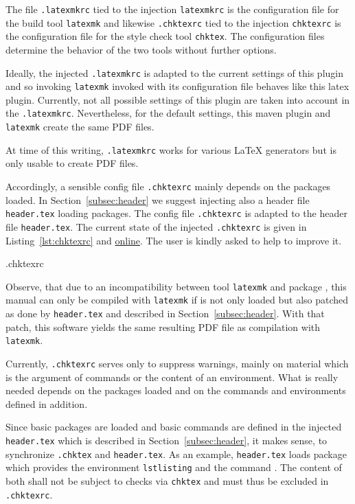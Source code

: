 The file \texttt{.latexmkrc} tied to the injection \texttt{latexmkrc} 
is the configuration file for the build tool \texttt{latexmk} 
and likewise \texttt{.chktexrc} tied to the injection \texttt{chktexrc} 
is the configuration file for the style check tool \texttt{chktex}. 
The configuration files determine the behavior of the two tools without further options. 

Ideally, the injected \texttt{.latexmkrc} is adapted to the current settings of this plugin 
and so invoking \texttt{latexmk} invoked with its configuration file 
behaves like this latex plugin. 
Currently, not all possible settings of this plugin 
are taken into account in the \texttt{.latexmkrc}. 
Nevertheless, for the default settings, 
this maven plugin and \texttt{latexmk} create the same PDF files. 

At time of this writing, \texttt{.latexmkrc} works for various \LaTeX{} generators 
but is only usable to create PDF files. 

Accordingly, a sensible config file \texttt{.chktexrc} mainly depends on the packages loaded. 
In Section~\ref{subsec:header} we suggest injecting also a header file \texttt{header.tex} 
loading packages. 
The config file \texttt{.chktexrc} is adapted to the header file \texttt{header.tex}. 
The current state of the injected \texttt{.chktexrc} is given in Listing~\ref{lst:chktexrc} 
and \href{\urlSite fromTex/.chktexrc}{online}. 
The user is kindly asked to help to improve it.

%
{.chktexrc}

Observe, that due to an incompatibility between tool \texttt{latexmk} and package , 
this manual can only be compiled with \texttt{latexmk} 
if  is not only loaded but also patched 
as done by \texttt{header.tex} and described in Section~\ref{subsec:header}. 
With that patch, this software yields the same resulting PDF file 
as compilation with \texttt{latexmk}. 

Currently, \texttt{.chktexrc} serves only to suppress warnings, 
mainly on material which is the argument of commands or the content of an environment. 
What is really needed depends on the packages loaded 
and on the commands and environments defined in addition. 

Since basic packages are loaded and basic commands are defined 
in the injected \texttt{header.tex} 
which is described in Section~\ref{subsec:header}, 
it makes sense, to synchronize \texttt{.chktex} and \texttt{header.tex}. 
As an example, \texttt{header.tex} loads package  
which provides the environment \texttt{lstlisting} and the command . 
The content of both shall not be subject to checks via \texttt{chktex} 
and must thus be excluded in \texttt{.chktexrc}. 


